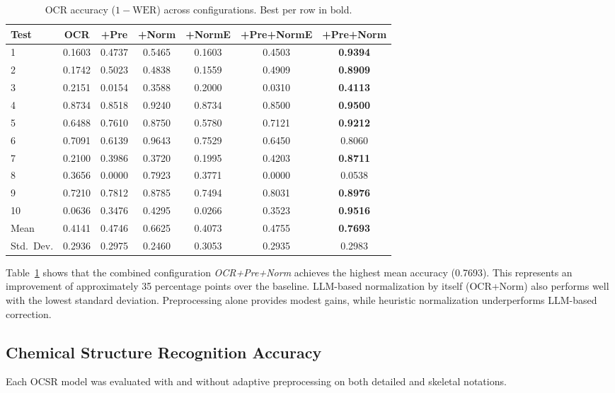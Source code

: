 \documentclass[conference]{IEEEtran}
\begin{document}
\begin{table}[t]
\centering
\small
\caption{OCR accuracy ($1 - \text{WER}$) across configurations. Best per row in bold.}
\label{tab:ocr}
\begin{tabular}{lcccccc}
\toprule
Test & OCR & +Pre & +Norm & +NormE & +Pre+NormE & \textbf{+Pre+Norm} \\
\midrule
1 & 0.1603 & 0.4737 & 0.5465 & 0.1603 & 0.4503 & \textbf{0.9394} \\
2 & 0.1742 & 0.5023 & 0.4838 & 0.1559 & 0.4909 & \textbf{0.8909} \\
3 & 0.2151 & 0.0154 & 0.3588 & 0.2000 & 0.0310 & \textbf{0.4113} \\
4 & 0.8734 & 0.8518 & 0.9240 & 0.8734 & 0.8500 & \textbf{0.9500} \\
5 & 0.6488 & 0.7610 & 0.8750 & 0.5780 & 0.7121 & \textbf{0.9212} \\
6 & 0.7091 & 0.6139 & 0.9643 & 0.7529 & 0.6450 & 0.8060 \\
7 & 0.2100 & 0.3986 & 0.3720 & 0.1995 & 0.4203 & \textbf{0.8711} \\
8 & 0.3656 & 0.0000 & 0.7923 & 0.3771 & 0.0000 & 0.0538 \\
9 & 0.7210 & 0.7812 & 0.8785 & 0.7494 & 0.8031 & \textbf{0.8976} \\
10 & 0.0636 & 0.3476 & 0.4295 & 0.0266 & 0.3523 & \textbf{0.9516} \\
\midrule
Mean & 0.4141 & 0.4746 & 0.6625 & 0.4073 & 0.4755 & \textbf{0.7693} \\
Std.~Dev. & 0.2936 & 0.2975 & 0.2460 & 0.3053 & 0.2935 & 0.2983 \\
\bottomrule
\end{tabular}
\end{table}

Table~\ref{tab:ocr} shows that the combined configuration \textit{OCR+Pre+Norm} achieves the highest mean accuracy (0.7693). This represents an improvement of approximately 35 percentage points over the baseline. LLM-based normalization by itself (OCR+Norm) also performs well with the lowest standard deviation. Preprocessing alone provides modest gains, while heuristic normalization underperforms LLM-based correction.

\subsection{Chemical Structure Recognition Accuracy}

Each OCSR model was evaluated with and without adaptive preprocessing on both detailed and skeletal notations.
\end{document}
